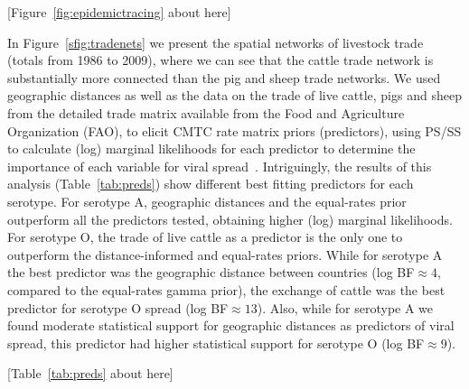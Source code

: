 \documentclass[10pt]{article}
\begin{document}
\begin{center}
 [Figure~\ref{fig:epidemictracing} about here]
\end{center}

In Figure~\ref{sfig:tradenets} we present the spatial networks of livestock trade (totals from 1986 to 2009), where we can see that the cattle trade network is substantially more connected than the pig and sheep trade networks.
We used geographic distances as well as the data on the trade of live cattle, pigs and sheep from the detailed trade matrix available from the Food and Agriculture Organization (FAO), to elicit CMTC rate matrix priors (predictors), using PS/SS to calculate (log) marginal likelihoods for each predictor to determine the importance of each variable for viral spread~\cite{Carvalho2013, Nelson2011}.
Intriguingly, the results of this analysis (Table~\ref{tab:preds}) show different best fitting predictors for each serotype.
For serotype A, geographic distances and the equal-rates prior outperform all the predictors tested, obtaining higher (log) marginal likelihoods.
For serotype O, the trade of live cattle as a predictor is the only one to outperform the distance-informed and equal-rates priors.
While for serotype A the best predictor was the geographic distance between countries (log BF$\approx 4$, compared to the equal-rates gamma prior), the exchange of cattle was the best predictor for serotype O spread (log BF$\approx 13$).
Also, while for serotype A we found moderate statistical support for geographic distances as predictors of viral spread, this predictor had higher statistical support for serotype O (log BF$\approx 9$).

\begin{center}
 [Table~\ref{tab:preds} about here]
\end{center}
\end{document}
